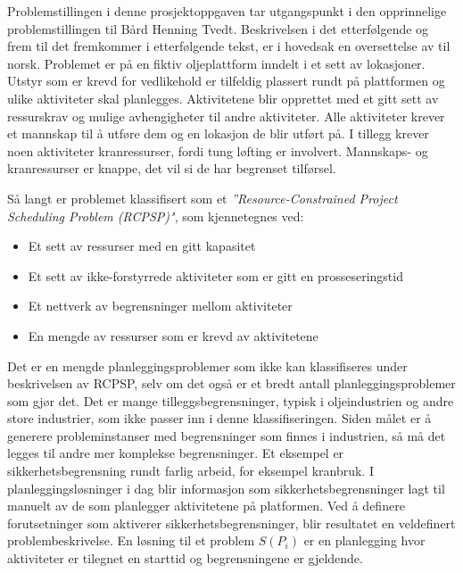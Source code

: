 Problemstillingen i denne prosjektoppgaven tar utgangspunkt i den opprinnelige problemstillingen til Bård Henning Tvedt. Beskrivelsen i det etterfølgende og frem til det fremkommer i etterfølgende tekst, er i hovedsak en oversettelse av \cite{tvedtbezem} til norsk. Problemet er på en fiktiv oljeplattform inndelt i et sett av lokasjoner. Utstyr som er krevd for vedlikehold er tilfeldig plassert rundt på plattformen og ulike aktiviteter skal planlegges. Aktivitetene blir opprettet med et gitt sett av ressurskrav og mulige avhengigheter til andre aktiviteter. Alle aktiviteter krever et mannskap til å utføre dem og en lokasjon de blir utført på. I tillegg krever noen aktiviteter kranressurser, fordi tung løfting er involvert. Mannskaps- og kranressurser er knappe, det vil si de har begrenset tilførsel.

Så langt er problemet klassifisert som et \textit{''Resource-Constrained Project Scheduling Problem (RCPSP)"}\cite{RcpspPaperSchutt}, som kjennetegnes ved:
\begin{itemize}
\item Et sett av ressurser med en gitt kapasitet
\item Et sett av ikke-forstyrrede aktiviteter som er gitt en prosseseringstid
\item Et nettverk av begrensninger mellom aktiviteter
\item En mengde av ressurser som er krevd av aktivitetene
\end{itemize}

Det er en mengde planleggingsproblemer som ikke kan klassifiseres under beskrivelsen av RCPSP, selv om det også er et bredt antall planleggingsproblemer som gjør det. Det er mange tilleggsbegrensninger, typisk i oljeindustrien og andre store industrier, som ikke passer inn i denne klassifiseringen. Siden målet er å generere probleminstanser med begrensninger som finnes i industrien, så må det legges til andre mer komplekse begrensninger. Et eksempel  er sikkerhetsbegrensning rundt farlig arbeid, for eksempel kranbruk. I planleggingsløsninger i dag blir informasjon som sikkerhetsbegrensninger lagt til manuelt av de som planlegger aktivitetene på platformen. Ved å definere forutsetninger som aktiverer sikkerhetsbegrensninger, blir resultatet en veldefinert problembeskrivelse. En løsning til et problem $ S(P_{i}) $ er en planlegging hvor aktiviteter er tilegnet en starttid og begrensningene er gjeldende.

